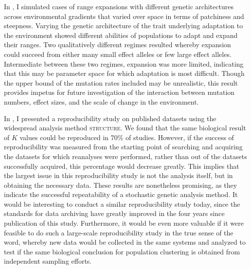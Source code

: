 In , I simulated cases of range expansions with different genetic architectures across environmental gradients that varied over space in terms of patchiness and steepness. Varying the genetic architecture of the trait underlying adaptation to the environment showed different abilities of populations to adapt and expand their ranges. Two qualitatively different regimes resulted whereby expansion could succeed from either many small effect alleles or few large effect alleles. Intermediate between these two regimes, expansion was more limited, indicating that this may be parameter space for which adaptation is most difficult. Though the upper bound of the mutation rates included may be unrealistic, this result provides impetus for future investigation of the interaction between mutation numbers, effect sizes, and the scale of change in the environment.

In , I presented a reproducibility study on published datasets using the widespread analysis method \textsc{structure}. We found that the same biological result of $K$ values could be reproduced in 70\% of studies. However, if the success of reproducibility was measured from the starting point of searching and acquiring the datasets for which reanalyses were performed, rather than out of the datasets successfully acquired, this percentage would decrease greatly. This implies that the largest issue in this reproducibility study is not the analysis itself, but in obtaining the necessary data. These results are nonetheless promising, as they indicate the successful repeatability of a stochastic genetic analysis method. It would be interesting to conduct a similar reproducibility study today, since the standards for data archiving have greatly improved in the four years since publication of this study. Furthermore, it would be even more valuable if it were feasible to do such a large-scale reproducibility study in the true sense of the word, whereby new data would be collected in the same systems and analyzed to test if the same biological conclusion for population clustering is obtained from independent sampling efforts.




